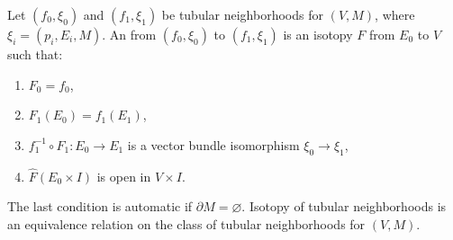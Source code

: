 Let $(f_0,\xi_0)$ and $(f_1,\xi_1)$ be tubular neighborhoods for $(V,M)$, where $\xi_i = (p_i, E_i, M)$. An  from $(f_0,\xi_0)$ to $(f_1,\xi_1)$ is an isotopy $F$ from $E_0$ to $V$ such that:
\begin{enumerate}
\item $F_0 = f_0$,
\item $F_1(E_0) = f_1(E_1)$,
\item $f_1^{-1} \circ F_1: E_0 \rightarrow E_1$ is a vector bundle isomorphism $\xi_0 \rightarrow \xi_1$,
\item $\hat{F}(E_0 \times I)$ is open in $V \times I$.
\end{enumerate}
The last condition is automatic if $\partial M = \varnothing$. Isotopy of tubular neighborhoods is an equivalence relation on the class of tubular neighborhoods for $(V,M)$.
